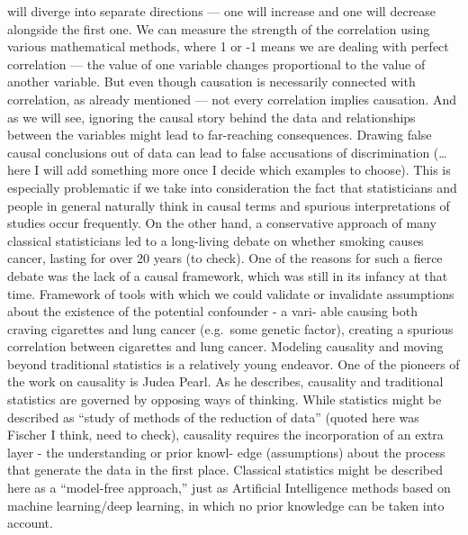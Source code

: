\documentclass[
  10pt,
  dvipsnames,enabledeprecatedfontcommands]{scrartcl}
\begin{document}
will diverge into separate directions --- one will increase and one will
decrease alongside the first one. We can measure the strength of the
correlation using various mathematical methods, where 1 or -1 means we
are dealing with perfect correlation --- the value of one variable
changes proportional to the value of another variable. But even though
causation is necessarily connected with correlation, as already
mentioned --- not every correlation implies causation. And as we will
see, ignoring the causal story behind the data and relationships between
the variables might lead to far-reaching consequences. Drawing false
causal conclusions out of data can lead to false accusations of
discrimination (\ldots here I will add something more once I decide
which examples to choose). This is especially problematic if we take
into consideration the fact that statisticians and people in general
naturally think in causal terms and spurious interpretations of studies
occur frequently. On the other hand, a conservative approach of many
classical statisticians led to a long-living debate on whether smoking
causes cancer, lasting for over 20 years (to check). One of the reasons
for such a fierce debate was the lack of a causal framework, which was
still in its infancy at that time. Framework of tools with which we
could validate or invalidate assumptions about the existence of the
potential confounder - a vari- able causing both craving cigarettes and
lung cancer (e.g.~some genetic factor), creating a spurious correlation
between cigarettes and lung cancer. Modeling causality and moving beyond
traditional statistics is a relatively young endeavor. One of the
pioneers of the work on causality is Judea Pearl. As he describes,
causality and traditional statistics are governed by opposing ways of
thinking. While statistics might be described as ``study of methods of
the reduction of data'' (quoted here was Fischer I think, need to
check), causality requires the incorporation of an extra layer - the
understanding or prior knowl- edge (assumptions) about the process that
generate the data in the first place. Classical statistics might be
described here as a ``model-free approach,'' just as Artificial
Intelligence methods based on machine learning/deep learning, in which
no prior knowledge can be taken into account.
\end{document}
